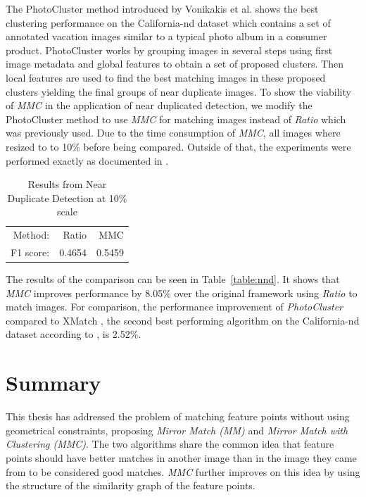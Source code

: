 \documentclass{article}
\begin{document}
The PhotoCluster method introduced by Vonikakis et al.  
\cite{vas2013cluster} shows the best clustering performance on the 
California-nd dataset \cite{jinda2012california} which contains a set of
annotated vacation images similar to a typical photo album in a consumer
product. PhotoCluster works by grouping images in several steps using 
first image metadata and global features to obtain a set of proposed 
clusters. Then local features are used to find the best matching images 
in these proposed clusters yielding the final groups of near duplicate 
images. To show the viability of \emph{MMC} in the application of near 
duplicated detection, we modify the PhotoCluster method to use 
\emph{MMC} for matching images instead of \emph{Ratio} which was 
previously used. Due to the time consumption of \emph{MMC}, all images 
where resized to to 10\% before being compared. Outside of that, the 
experiments were performed exactly as documented in 
\cite{vas2013cluster}.

\begin{table}[htb]
\caption{Results from Near Duplicate Detection at 10\% scale}
\label{table:ndd}
	\centering
\begin{tabular}{r*{2}{r}}
\hline
    Method: & Ratio & MMC   \\
	\noalign{\smallskip}
    F1 score: & 0.4654 & 0.5459 \\
	\hline
\end{tabular}
\end{table}

The results of the comparison can be seen in Table~\ref{table:nnd}. It 
shows that \emph{MMC} improves performance by 8.05\% over the original 
framework using \emph{Ratio} to match images. For comparison, the 
performance improvement of \emph{PhotoCluster} compared to XMatch 
\cite{zhao2009scale}, the second best performing algorithm on the 
California-nd dataset according to \cite{vas2013cluster}, is 2.52\%.

\section{Summary}
\label{S:Summary}

This thesis has addressed the problem of matching feature points without 
using geometrical constraints, proposing \emph{Mirror Match (MM)} and 
\emph{Mirror Match with Clustering (MMC)}.  The two algorithms share the 
common idea that feature points should have better matches in another 
image than in the image they came from to be considered good matches.  
\emph{MMC} further improves on this idea by using the structure of the 
similarity graph of the feature points. 
\end{document}
